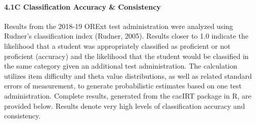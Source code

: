 \documentclass[]{article}
\let\oldparagraph\paragraph
\renewcommand{\paragraph}[1]{\oldparagraph{#1}\mbox{}}
\begin{document}
\hypertarget{c-classification-accuracy-consistency}{%
\paragraph{4.1C Classification Accuracy \&
Consistency}\label{c-classification-accuracy-consistency}}

Results from the 2018-19 ORExt test administration were analyzed using
Rudner's classification index (Rudner, 2005). Results closer to 1.0
indicate the likelihood that a student was appropriately classified as
proficient or not proficient (accuracy) and the likelihood that the
student would be classified in the same category given an additional
test administration. The calculation utilizes item difficulty and theta
value distributions, as well as related standard errors of measurement,
to generate probabilistic estimates based on one test administration.
Complete results, generated from the cacIRT package in R, are provided
below. Results denote very high levels of classification accuracy and
consistency.
\end{document}
